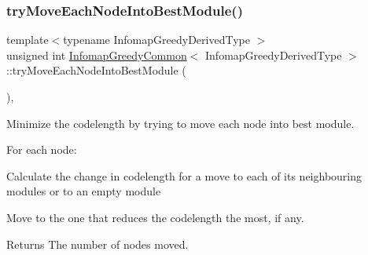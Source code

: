 \subsubsection{\texorpdfstring{try\+Move\+Each\+Node\+Into\+Best\+Module()}{tryMoveEachNodeIntoBestModule()}}
{\footnotesize\ttfamily template$<$typename Infomap\+Greedy\+Derived\+Type $>$ \\
unsigned int \mbox{\hyperlink{classInfomapGreedyCommon}{Infomap\+Greedy\+Common}}$<$ Infomap\+Greedy\+Derived\+Type $>$\+::try\+Move\+Each\+Node\+Into\+Best\+Module (\begin{DoxyParamCaption}{ }\end{DoxyParamCaption})\hspace{0.3cm}{\ttfamily [inline]}, {\ttfamily [protected]}}

Minimize the codelength by trying to move each node into best module.

For each node\+:
\begin{DoxyEnumerate}
\item Calculate the change in codelength for a move to each of its neighbouring modules or to an empty module
\item Move to the one that reduces the codelength the most, if any.
\end{DoxyEnumerate}

\begin{DoxyReturn}{Returns}
The number of nodes moved. 
\end{DoxyReturn}

